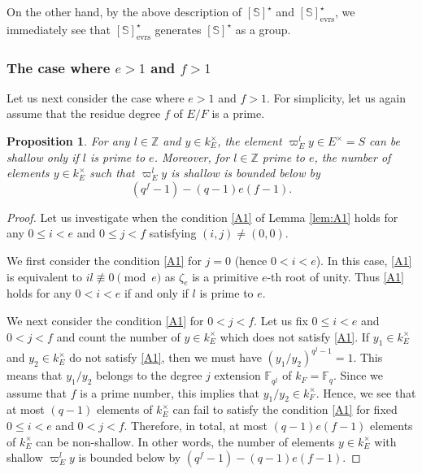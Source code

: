 \documentclass{amsart}
\newcommand{\evrs}{\mathrm{evrs}}
\newcommand{\Z}{\mathbb{Z}}
\newcommand{\F}{\mathbb{F}}
\newcommand{\bbS}{\mathbb{S}}
\theoremstyle{plain}
\newtheorem{prop}[thm]{Proposition}
\theoremstyle{definition}
\theoremstyle{remark}
\theoremstyle{theorem}
\begin{document}
On the other hand, by the above description of $[\bbS]^{\star}$ and $[\bbS]^{\star}_{\evrs}$, we immediately see that $[\bbS]^{\star}_{\evrs}$ generates $[\bbS]^{\star}$ as a group.


\subsubsection{The case where $e>1$ and $f>1$}\label{subsubsec:remaining}
Let us next consider the case where $e>1$ and $f>1$.
For simplicity, let us again assume that the residue degree $f$ of $E/F$ is a prime.

\begin{prop}\label{prop:A1}
For any $l\in\Z$ and $y\in k_{E}^{\times}$, the element $\varpi_{E}^{l}y\in E^{\times}=S$ can be shallow only if $l$ is prime to $e$.
Moreover, for $l\in\Z$ prime to $e$, the number of elements $y\in k_{E}^{\times}$ such that $\varpi_{E}^{l}y$ is shallow is bounded below by
\[
(q^{f}-1)-(q-1)e(f-1).
\]
\end{prop}

\begin{proof}
Let us investigate when the condition \eqref{A1} of Lemma \ref{lem:A1} holds for any $0\leq i<e$ and $0\leq j<f$ satisfying $(i,j)\neq(0,0)$.

We first consider the condition \eqref{A1} for $j=0$ (hence $0<i<e$).
In this case, \eqref{A1} is equivalent to $il\not\equiv0 \pmod{e}$ as $\zeta_{e}$ is a primitive $e$-th root of unity.
Thus \eqref{A1} holds for any $0<i<e$ if and only if $l$ is prime to $e$.

We next consider the condition \eqref{A1} for $0<j<f$.
Let us fix $0\leq i<e$ and $0<j<f$ and count the number of $y\in k_{E}^{\times}$ which does not satisfy \eqref{A1}.
If $y_{1}\in k_{E}^{\times}$ and $y_{2}\in k_{E}^{\times}$ do not satisfy \eqref{A1}, then we must have $(y_{1}/y_{2})^{q^{j}-1}=1$.
This means that $y_{1}/y_{2}$ belongs to the degree $j$ extension $\F_{q^{j}}$ of $k_{F}=\F_{q}$.
Since we assume that $f$ is a prime number, this implies that $y_{1}/y_{2}\in k_{F}^{\times}$.
Hence, we see that at most $(q-1)$ elements of $k_{E}^{\times}$ can fail to satisfy the condition \eqref{A1} for fixed $0\leq i<e$ and $0<j<f$.
Therefore, in total, at most $(q-1)e(f-1)$ elements of $k_{E}^{\times}$ can be non-shallow.
In other words, the number of elements $y\in k_{E}^{\times}$ with shallow $\varpi_{E}^{l}y$ is bounded below by $(q^{f}-1)-(q-1)e(f-1)$.
\end{proof}
\end{document}
